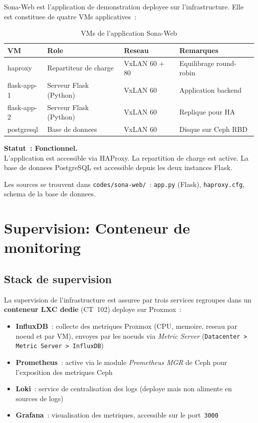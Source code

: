 \documentclass[a4paper,11pt]{article}
\newenvironment{successbox}{%
  \begin{mdframed}[linecolor=vert,backgroundcolor=vert!7,linewidth=1pt,
    leftmargin=0pt,rightmargin=0pt,innertopmargin=6pt,innerbottommargin=6pt]
}{%
  \end{mdframed}
}
\begin{document}
Sona-Web est l'application de demonstration deployee sur l'infrastructure.
Elle est constituee de quatre VMs applicatives~:

\begin{table}[H]
  \caption{VMs de l'application Sona-Web}
  \centering
  \begin{tabular}{L{2.5cm}L{3cm}C{2.5cm}L{4cm}}
    \toprule
    \textbf{VM} & \textbf{Role} & \textbf{Reseau} & \textbf{Remarques} \\
    \midrule
    haproxy     & Repartiteur de charge  & VxLAN 60 + 80 & Equilibrage round-robin \\
    flask-app-1 & Serveur Flask (Python) & VxLAN 60      & Application backend \\
    flask-app-2 & Serveur Flask (Python) & VxLAN 60      & Replique pour HA \\
    postgresql  & Base de donnees        & VxLAN 60      & Disque sur Ceph RBD \\
    \bottomrule
  \end{tabular}
\end{table}

\begin{successbox}
  \textbf{Statut~: Fonctionnel.}\\
  L'application est accessible via HAProxy. La repartition de charge est active.
  La base de donnees PostgreSQL est accessible depuis les deux instances Flask.
\end{successbox}

Les sources se trouvent dans \texttt{codes/sona-web/}~: \texttt{app.py} (Flask),
\texttt{haproxy.cfg}, schema de la base de donnees.

\section{Supervision: Conteneur de monitoring}

\subsection{Stack de supervision}

La supervision de l'infrastructure est assuree par trois services regroupes dans un
\textbf{conteneur LXC dedie} (CT~102) deploye sur Proxmox~:

\begin{itemize}[noitemsep]
  \item \textbf{InfluxDB}~: collecte des metriques Proxmox (CPU, memoire, reseau par noeud et par VM),
        envoyes par les noeuds via \textit{Metric Server} (\texttt{Datacenter > Metric Server > InfluxDB})
  \item \textbf{Prometheus}~: active via le module \textit{Prometheus MGR} de Ceph pour l'exposition
        des metriques Ceph
  \item \textbf{Loki}~: service de centralisation des logs (deploye mais non alimente en sources de logs)
  \item \textbf{Grafana}~: visualisation des metriques, accessible sur le port~\texttt{3000}
\end{itemize}
\end{document}
